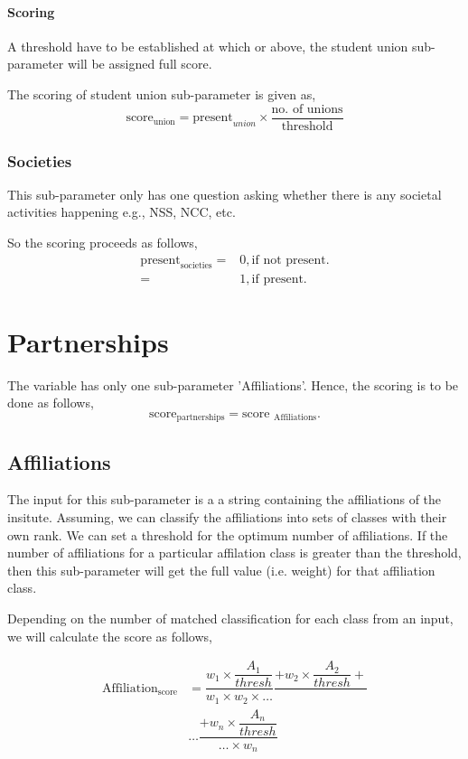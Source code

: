 \documentclass[oneside,twocolumn]{article}
\begin{document}
\paragraph{Scoring}
A threshold have to be established at which or above,
the student union sub-parameter will be assigned full
score.

The scoring of student union sub-parameter is given as,
\[
\text{score}_{\text{union}} = \text{present}_{union} \times 
\dfrac{\text{no. of unions}}{\text{threshold}}
\]

\subsubsection{Societies}
This sub-parameter only has one question asking whether
there is any societal activities happening e.g., NSS, NCC, etc.

So the scoring proceeds as follows,
\begin{align*}
  \text{present}_{\text{societies}} =& 0, \text{if not present.} \\
  =& 1, \text{if present.}
\end{align*}

\section{Partnerships}
The variable has only one sub-parameter 'Affiliations'.
Hence, the scoring is to be done as follows,
\[
\text{score}_{\text{partnerships}} = \text{score }_{\text{Affiliations}}.
\]
\subsection{Affiliations}
The input for this sub-parameter is a a string containing the
affiliations of the insitute. Assuming, we can classify the
affiliations into sets of classes with their own rank. We can
set a threshold for the optimum number of affiliations. If the
number of affiliations for a particular affilation class is
greater than the threshold, then this sub-parameter will get the
full value (i.e. weight) for that affiliation class.

Depending on the number of matched classification for each
class from an input, we will calculate the score as follows,

\begin{align*}
  \text{Affiliation}_{\text{score}} &= \dfrac{w_1 \times \dfrac{A_1}{thresh}}{w_1 \times w_2 \times \dots} \dfrac{+ w_2 \times \dfrac{A_2}{thresh} +}{} \\
  &\dots \dfrac{+ w_n \times \dfrac{A_n}{thresh}}{\dots \times w_n}
\end{align*}
\end{document}
